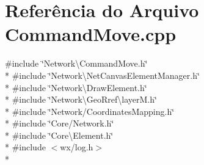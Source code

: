 \section{Referência do Arquivo Command\+Move.\+cpp}
\label{_command_move_8cpp}
{\ttfamily \#include \char`\"{}Network\textbackslash{}\+Command\+Move.\+h\char`\"{}}\\*
{\ttfamily \#include \char`\"{}Network\textbackslash{}\+Net\+Canvas\+Element\+Manager.\+h\char`\"{}}\\*
{\ttfamily \#include \char`\"{}Network\textbackslash{}\+Draw\+Element.\+h\char`\"{}}\\*
{\ttfamily \#include \char`\"{}Network\textbackslash{}\+Geo\+Rref\textbackslash{}layer\+M.\+h\char`\"{}}\\*
{\ttfamily \#include \char`\"{}Network/\+Coordinates\+Mapping.\+h\char`\"{}}\\*
{\ttfamily \#include \char`\"{}Core/\+Network.\+h\char`\"{}}\\*
{\ttfamily \#include \char`\"{}Core\textbackslash{}\+Element.\+h\char`\"{}}\\*
{\ttfamily \#include $<$wx/log.\+h$>$}\\*

